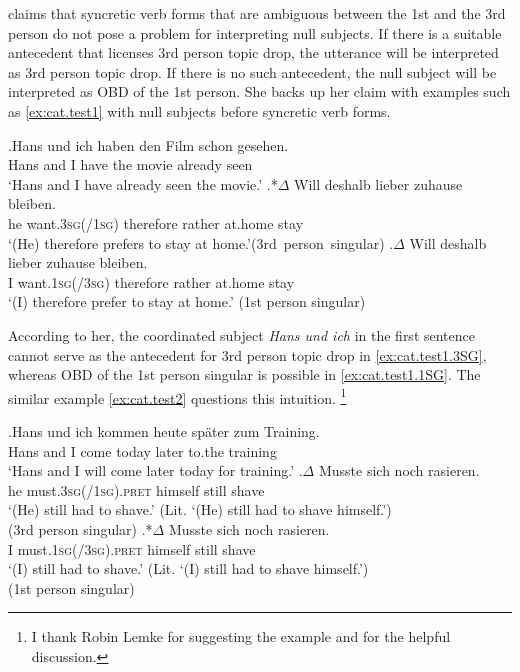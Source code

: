 \noindent
\citet{trutkowski2016} claims that syncretic  verb forms that are ambiguous  between the 1st and the 3rd person do not pose a problem for interpreting null subjects.
If there is a suitable antecedent  that licenses 3rd person topic drop, the utterance will be interpreted as 3rd person topic drop.
If there is no such antecedent,  the null subject will be interpreted as OBD of the 1st person.
She backs up her claim with examples such as \ref{ex:cat.test1} with null subjects before syncretic  verb forms.

\exg.\label{ex:cat.test1}Hans und ich haben den Film schon gesehen.\\
Hans and I have the movie already seen\\
`Hans and I have already seen the movie.'
\ag.\label{ex:cat.test1.3SG}*$\Delta$ Will deshalb lieber zuhause bleiben.\\
\phantom{*}he want.\textsc{3sg}(/\textsc{1sg}) therefore rather at.home stay\\
`(He) therefore prefers to stay at home.'\hfill\mbox{(3rd person singular)}
\bg.\label{ex:cat.test1.1SG}$\Delta$ Will deshalb lieber zuhause bleiben.\\
I want.\textsc{1sg}(/\textsc{3sg}) therefore rather at.home stay\\
`(I) therefore prefer to stay at home.' \hfill (1st person singular) \citep[208, her judgments]{trutkowski2016}

According to her, the coordinated subject \textit{Hans und ich} in the first sentence cannot serve as the antecedent  for 3rd person topic drop in \ref{ex:cat.test1.3SG}, whereas OBD of the 1st person singular is possible in \ref{ex:cat.test1.1SG}.
The similar example \ref{ex:cat.test2} questions this intuition.%
\footnote{I thank Robin Lemke for suggesting the example and for the helpful discussion.
}

\exg.\label{ex:cat.test2}Hans und ich kommen heute später zum Training.\\
Hans and I come today later to.the training\\
`Hans and I will come later today for training.'
\ag.\label{ex:cat.test2.3SG}$\Delta$ Musste sich noch rasieren.\\
he must.\textsc{3sg}(/\textsc{1sg}).\textsc{pret} himself still shave\\
`(He) still had to shave.' (Lit. `(He) still had to shave himself.') \\\phantom{.} \hfill (3rd person singular)
\bg.*\label{ex:cat.test2.1SG}$\Delta$ Musste sich noch rasieren.\\
I must.\textsc{1sg}(/\textsc{3sg}).\textsc{pret} himself still shave\\
`(I) still had to shave.' (Lit. `(I) still had to shave himself.') \\\phantom{.}\hfill (1st person singular)

